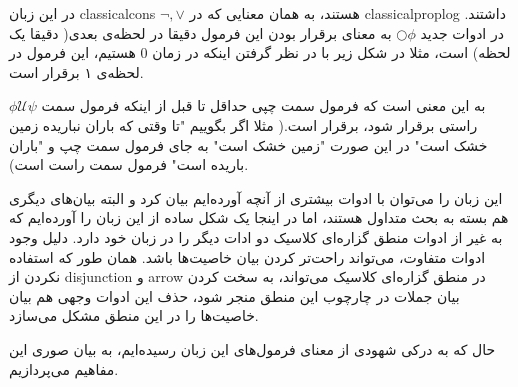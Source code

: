 در این زبان \glspl*{classicalcon}
$\neg, \lor$
هستند، به همان معنایی که در \gls*{classicalproplog} داشتند.  
در ادوات جدید 
$\bigcirc \phi$
به معنای برقرار بودن این فرمول دقیقا در لحظه‌ی بعدی( دقیقا یک لحظه) است، مثلا در شکل زیر با در نظر گرفتن اینکه در زمان 0 هستیم، این فرمول در لحظه‌ی ۱ برقرار است.
	\begin{center}
\end{center}
$\phi \mathcal{U}\psi$
به این معنی است که فرمول سمت چپی حداقل تا قبل از اینکه فرمول سمت راستی برقرار شود، برقرار است.( مثلا اگر بگوییم "تا وقتی که باران نباریده زمین خشک است" در این صورت "زمین خشک است" به جای فرمول سمت چپ و "باران باریده است" فرمول سمت راست است).
\begin{center}
\end{center}

این زبان را می‌توان با ادوات بیشتری از آنچه آورده‌ایم بیان کرد و البته بیان‌های دیگری هم بسته به بحث متداول هستند، اما در اینجا یک شکل ساده از این زبان را آورده‌ایم که به غیر از ادوات منطق گزاره‌ای کلاسیک دو ادات دیگر را در زبان خود دارد. دلیل وجود ادوات متفاوت، می‌تواند راحت‌تر کردن بیان خاصیت‌ها باشد. همان طور که استفاده نکردن از \gls*{disjunction} و \gls*{arrow} در منطق گزاره‌ای کلاسیک می‌تواند، به سخت کردن بیان جملات در چارچوب این منطق منجر شود، حذف این ادوات وجهی هم بیان خاصیت‌ها را در این منطق مشکل می‌سازد. 

حال که به درکی شهودی از معنای فرمول‌های این زبان رسیده‌ایم، به بیان صوری این مفاهیم می‌پردازیم.

